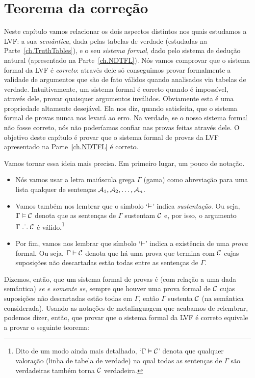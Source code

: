 \chapter{Teorema da correção}\label{ch:Soundness}

Neste capítulo vamos relacionar os dois aspectos distintos nos quais estudamos a LVF: a sua \textit{semântica}, dada pelas tabelas de verdade (estudadas  na Parte~\ref{ch.TruthTables}), e o seu \emph{sistema formal}, dado pelo sistema de dedução natural (apresentado na Parte~\ref {ch.NDTFL}).
Nós vamos comprovar que o sistema formal da LVF é \textit{correto}: através dele só conseguimos provar formalmente a validade de argumentos que são de fato válidos quando analisados via tabelas de verdade.
Intuitivamente, um sistema formal é correto quando é impossível, através dele, provar quaisquer argumentos inválidos.
Obviamente esta é uma propriedade altamente desejável.
Ela nos diz, quando satisfeita, que o sistema formal de provas nunca nos levará ao erro.
Na verdade, se o nosso sistema formal não fosse correto, nós não poderíamos confiar nas provas feitas através dele.
O objetivo deste capítulo é provar que o sistema formal de provas da LVF apresentado na Parte~\ref {ch.NDTFL} é correto.

Vamos tornar essa ideia mais precisa.
Em primeiro lugar, um pouco de notação.
\begin{itemize}
	\item Nós vamos usar a letra maiúscula grega $\Gamma$ (gama) como abreviação para uma lista qualquer de sentenças $\mathcal{A}_1, \mathcal{A}_2, \ldots, \mathcal{A}_n$.
	\item Vamos também nos lembrar que o símbolo `$\vDash$' indica \textit{sustentação}. Ou seja, $\Gamma \vDash \mathcal{C}$ denota que as sentenças de $\Gamma$ sustentam $\mathcal{C}$ e, por isso, o argumento $\Gamma \mathrel{\ldotp\dot{}\,\ldotp} \mathcal{C}$ é válido.\footnote{
		Dito de um modo ainda mais detalhado, `$\Gamma \vDash \mathcal{C}$' denota que qualquer valoração (linha de tabela de verdade) na qual todas as sentenças de $\Gamma$ são verdadeiras também torna $\mathcal{C}$ verdadeira.}
	\item Por fim, vamos nos lembrar que símbolo `$\vdash$' indica a existência de uma \textit{prova} formal. Ou seja, $\Gamma \vdash \mathcal{C}$ denota que há uma prova que termina com $\mathcal{C}$ cujas suposições não descartadas estão todas entre as sentenças de $\Gamma$.	
\end{itemize}
Dizemos, então, que um sistema formal de provas é  (com relação a uma dada semântica) \emph{se e somente se}, sempre que houver uma prova formal de $\mathcal{C}$ cujas suposições não descartadas estão todas em $\Gamma$, então $\Gamma$ sustenta $\mathcal{C}$ (na semântica considerada). 
Usando as notações de metalinguagem que acabamos de relembrar, podemos dizer, então, que provar que o sistema formal da LVF é correto equivale a provar o seguinte teorema:

